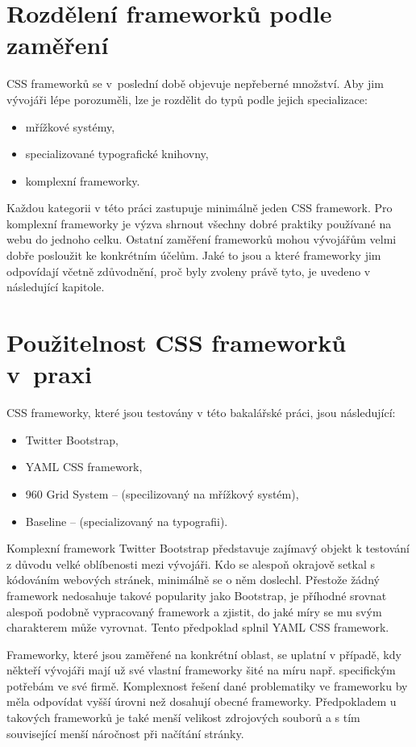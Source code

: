 \documentclass[thesis=B,czech]{FITthesis}[2012/06/26]
\begin{document}
\section{Rozdělení frameworků podle zaměření}

\gls{CSS} frameworků se v~poslední době objevuje nepřeberné množství. Aby jim vývojáři lépe porozuměli, lze je rozdělit do typů podle jejich specializace:

\begin{itemize}
 \item mřížkové systémy,
 \item specializované typografické knihovny,
 \item komplexní frameworky.
\end{itemize}
Každou kategorii v této práci zastupuje minimálně jeden \gls{CSS} framework. Pro komplexní frameworky je výzva shrnout všechny dobré praktiky používané na webu do jednoho celku. Ostatní zaměření frameworků mohou vývojářům velmi dobře posloužit ke konkrétním účelům. Jaké to jsou a které frameworky jim odpovídají včetně zdůvodnění, proč byly zvoleny právě tyto, je uvedeno v následující kapitole.


\section{Použitelnost CSS frameworků v~praxi}

\gls{CSS} frameworky, které jsou testovány v této bakalářské práci, jsou následující:

\begin{itemize}
 \item Twitter Bootstrap,
 \item \gls{YAML} \gls{CSS} framework,
 \item 960 Grid System -- (specilizovaný na mřížkový systém),
 \item Baseline -- (specializovaný na typografii).
\end{itemize}
Komplexní framework Twitter Bootstrap představuje zajímavý objekt k testování z důvodu velké oblíbenosti mezi vývojáři. Kdo se alespoň okrajově setkal s kódováním webových stránek, minimálně se o něm doslechl. Přestože žádný framework nedosahuje takové popularity jako Bootstrap, je příhodné srovnat alespoň podobně vypracovaný framework a zjistit, do jaké míry se mu svým charakterem může vyrovnat. Tento předpoklad splnil \gls{YAML} \gls{CSS} framework.

Frameworky, které jsou zaměřené na konkrétní oblast, se uplatní v případě, kdy někteří vývojáři mají už své vlastní frameworky šité na míru např. specifickým potřebám ve své firmě. Komplexnost řešení dané problematiky ve frameworku by měla odpovídat vyšší úrovni než dosahují obecné frameworky. Předpokladem u takových frameworků je také menší velikost zdrojových souborů a s tím související menší náročnost při načítání stránky.  
\end{document}
